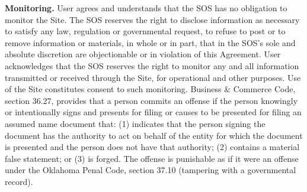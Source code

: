 \textbf{Monitoring.}
User agrees and understands that the SOS has no obligation to monitor the Site.
The SOS reserves the right to disclose information as necessary to satisfy any
law, regulation or governmental request, to refuse to post or to remove
information or materials, in whole or in part, that in the SOS's sole and
absolute discretion are objectionable or in violation of this Agreement. User
acknowledges that the SOS reserves the right to monitor any and all information
transmitted or received through the Site, for operational and other purposes.
Use of the Site constitutes consent to such monitoring. Business \& Commerce
Code, section 36.27, provides that a person commits an offense if the person
knowingly or intentionally signs and presents for filing or causes to be
presented for filing an assumed name document that: (1) indicates that the
person signing the document has the authority to act on behalf of the entity for
which the document is presented and the person does not have that authority; (2)
contains a material false statement; or (3) is forged. The offense is punishable
as if it were an offense under the Oklahoma Penal Code, section 37.10 (tampering
with a governmental record).